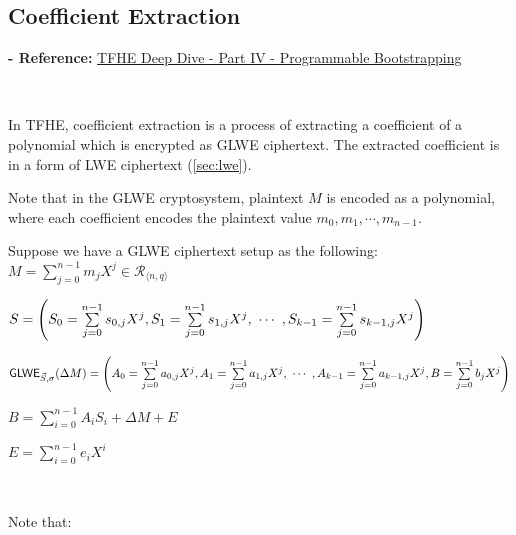 \subsection{Coefficient Extraction}
\label{subsec:tfhe-extraction}

\textbf{- Reference:} 
\href{https://www.zama.ai/post/tfhe-deep-dive-part-4}{TFHE Deep Dive - Part IV - Programmable Bootstrapping}~\cite{tfhe-4}

$ $

In TFHE, coefficient extraction is a process of extracting a coefficient of a polynomial which is encrypted as GLWE ciphertext. The extracted coefficient is in a form of LWE ciphertext (\autoref{sec:lwe}). %



Note that in the GLWE cryptosystem, plaintext $M$ is encoded as a polynomial, where each coefficient encodes the plaintext value $m_0, m_1, \cdots, m_{n-1}$.


Suppose we have a GLWE ciphertext setup as the following: \\ 
$M = \sum\limits_{j=0}^{n-1}m_jX^j \in \mathcal{R}_{\langle n, q \rangle}$ 

$S = \left(S_0 = \sum\limits_{j=0}^{n-1}s_{0,j}X^j, S_1 = \sum\limits_{j=0}^{n-1}s_{1,j}X^j, \text{ } \text{$\cdots$} \text{ }, S_{k-1} = \sum\limits_{j=0}^{n-1}s_{k-1,j}X^j \right)$ 

$\textsf{GLWE}_{\vec{S}, \sigma}(\Delta M) = \left(A_0 = \sum\limits_{j=0}^{n-1}a_{0,j}X^j, A_1 = \sum\limits_{j=0}^{n-1}a_{1,j}X^j, \text{ } \text{$\cdots$} \text{ }, A_{k-1} = \sum\limits_{j=0}^{n-1}a_{k-1,j}X^j, B = \sum\limits_{j=0}^{n-1}b_{j}X^j\right)$ 

$B = \sum\limits_{i=0}^{n-1}A_iS_i + \Delta M + E$ 

$E = \sum\limits_{i=0}^{n-1}e_iX^i$ 

$ $

\noindent Note that:


